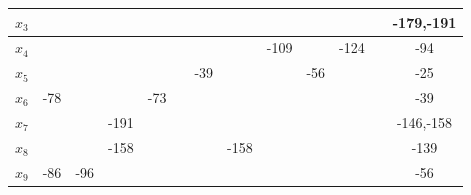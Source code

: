 \documentclass[12pt]{article}
\begin{document}
\begin{enumerate}
\begin{tabular}{|c|c|c|c|c|c|c|c|c|c|c|c|c|}
$x_{3}$  & {\color[HTML]{000000} }    & {\color[HTML]{000000} }     & {\color[HTML]{000000} }     & {\color[HTML]{000000} }    & {\color[HTML]{000000} }    & {\color[HTML]{000000} }    & {\color[HTML]{000000} }     & {\color[HTML]{000000} }     & {\color[HTML]{000000} }    & {\color[HTML]{000000} }     & {\color[HTML]{000000} }  & {\color[HTML]{FE0000} -179,-191} \\ \hline
$x_{4}$  & {\color[HTML]{000000} }    & {\color[HTML]{000000} }     & {\color[HTML]{000000} }     & {\color[HTML]{000000} }    & {\color[HTML]{000000} }    & {\color[HTML]{000000} }    & {\color[HTML]{000000} }     & {\color[HTML]{000000} -109} & {\color[HTML]{000000} }    & {\color[HTML]{000000} -124} & {\color[HTML]{000000} }  & {\color[HTML]{000000} -94}       \\ \hline
$x_{5}$  & {\color[HTML]{000000} }    & {\color[HTML]{000000} }     & {\color[HTML]{000000} }     & {\color[HTML]{000000} }    & {\color[HTML]{000000} }    & {\color[HTML]{000000} -39} & {\color[HTML]{000000} }     & {\color[HTML]{000000} }     & {\color[HTML]{000000} -56} & {\color[HTML]{000000} }     & {\color[HTML]{000000} }  & {\color[HTML]{000000} -25}       \\ \hline
$x_{6}$  & {\color[HTML]{000000} -78} & {\color[HTML]{000000} }     & {\color[HTML]{000000} }     & {\color[HTML]{000000} -73} & {\color[HTML]{000000} }    & {\color[HTML]{000000} }    & {\color[HTML]{000000} }     & {\color[HTML]{000000} }     & {\color[HTML]{000000} }    & {\color[HTML]{000000} }     & {\color[HTML]{000000} }  & {\color[HTML]{000000} -39}       \\ \hline
$x_{7}$  & {\color[HTML]{000000} }    & {\color[HTML]{000000} }     & {\color[HTML]{FE0000} -191} & {\color[HTML]{000000} }    & {\color[HTML]{000000} }    & {\color[HTML]{000000} }    & {\color[HTML]{000000} }     & {\color[HTML]{000000} }     & {\color[HTML]{000000} }    & {\color[HTML]{000000} }     & {\color[HTML]{000000} }  & {\color[HTML]{000000} -146,-158} \\ \hline
$x_{8}$  & {\color[HTML]{000000} }    & {\color[HTML]{000000} }     & {\color[HTML]{000000} -158} & {\color[HTML]{000000} }    & {\color[HTML]{000000} }    & {\color[HTML]{000000} }    & {\color[HTML]{000000} -158} & {\color[HTML]{000000} }     & {\color[HTML]{000000} }    & {\color[HTML]{000000} }     & {\color[HTML]{000000} }  & {\color[HTML]{000000} -139}      \\ \hline
$x_{9}$  & {\color[HTML]{000000} -86} & {\color[HTML]{000000} -96}  & {\color[HTML]{000000} }     & {\color[HTML]{000000} }    & {\color[HTML]{000000} }    & {\color[HTML]{000000} }    & {\color[HTML]{000000} }     & {\color[HTML]{000000} }     & {\color[HTML]{000000} }    & {\color[HTML]{000000} }     & {\color[HTML]{000000} }  & {\color[HTML]{000000} -56}       \\ \hline

\end{tabular}
\end{enumerate}
\end{document}
